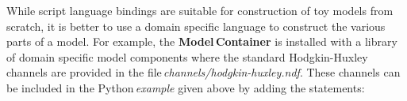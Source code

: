 \documentclass[10pt]{article}
\begin{document}

While script language bindings are suitable for construction of toy
models from scratch, it is better to use a domain specific language to
construct the various parts of a model. For example, the {\bf
  Model\,Container} is installed with a library of domain specific
model components where the standard Hodgkin-Huxley channels are
provided in the file\,{\it channels/hodgkin-huxley.ndf}.  These
channels can be included in the Python\,{\it example} given above by adding
the statements:
\end{document}
